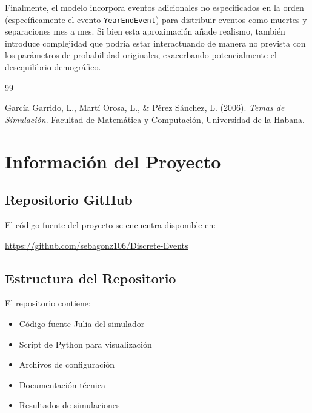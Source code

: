 \documentclass[12pt, a4paper, spanish]{report}
\begin{document}
Finalmente, el modelo incorpora eventos adicionales no especificados en la orden (específicamente el evento \texttt{YearEndEvent}) para distribuir eventos como muertes y separaciones mes a mes. Si bien esta aproximación añade realismo, también introduce complejidad que podría estar interactuando de manera no prevista con los parámetros de probabilidad originales, exacerbando potencialmente el desequilibrio demográfico.

\begin{thebibliography}{99}

García Garrido, L., Martí Orosa, L., \& Pérez Sánchez, L. (2006).
\emph{Temas de Simulación}.
Facultad de Matemática y Computación, Universidad de la Habana.

\end{thebibliography}

\appendix

\chapter{Información del Proyecto}

\section{Repositorio GitHub}

El código fuente del proyecto se encuentra disponible en:

\begin{center}
    \url{https://github.com/sebagonz106/Discrete-Events}
\end{center}

\section{Estructura del Repositorio}

El repositorio contiene:

\begin{itemize}
    \item Código fuente Julia del simulador
    \item Script de Python para visualización
    \item Archivos de configuración
    \item Documentación técnica
    \item Resultados de simulaciones
\end{itemize}
\end{document}
